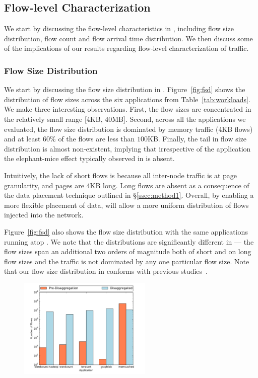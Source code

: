 \subsection{Flow-level Characterization} 
\label{ssec:flc}
We start by discussing the flow-level characteristics in \dis, including flow size distribution, flow count and flow arrival time distribution. We then discuss some of the implications of our results regarding flow-level characterization of \dis traffic.

\subsubsection{Flow Size Distribution}
We start by discussing the flow size distribution in \dis. Figure~\ref{fig:fsd} shows the distribution of flow sizes across the six applications from Table~\ref{tab:workloads}. We make three interesting observations. First, the flow sizes are concentrated in the relatively small range [4KB, 40MB]. Second, across all the applications we evaluated, the flow size distribution is dominated by memory traffic (4KB flows) and at least $60\%$ of the flows are less than $100$KB. Finally, the tail in flow size distribution is almost non-existent, implying that irrespective of the application the elephant-mice effect typically observed in \pdis is absent.

Intuitively, the lack of short flows is because all inter-node traffic is at page granularity, and pages are 4KB long. Long flows are absent as a consequence of the data placement technique outlined in \S\ref{ssec:method1}. Overall, by enabling a more flexible placement of data, \dis will allow a more uniform distribution of flows injected into the network.

Figure~\ref{fig:fsd} also shows the flow size distribution with the same applications running atop \pdis. We note that the distributions are significantly different in \pdis --- the flow sizes span an additional two orders of magnitude both of short and on long flow sizes and the traffic is not dominated by any one particular flow size. Note that our flow size distribution in \pdis conforms with previous studies~\cite{imc-srikant, imc-theo}.

%
\begin{figure}
  \centering
    \includegraphics[width = 2.5in]{img/graph2_numflows} 
  \caption{\small{}}
  \label{fig:nof}
\end{figure}
%
%
